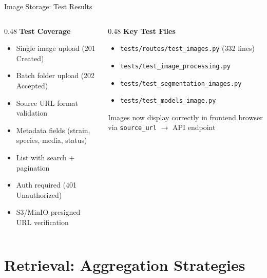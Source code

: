 \documentclass[aspectratio=169,11pt]{beamer}
\begin{document}
\begin{frame}{Image Storage: Test Results}
  \begin{columns}[T]
    \begin{column}{0.48\textwidth}
      \textbf{Test Coverage}
      \begin{itemize}
        \item Single image upload (201 Created)
        \item Batch folder upload (202 Accepted)
        \item Source URL format validation
        \item Metadata fields (strain, species, media, status)
        \item List with search + pagination
        \item Auth required (401 Unauthorized)
        \item S3/MinIO presigned URL verification
      \end{itemize}
    \end{column}
    \begin{column}{0.48\textwidth}
      \textbf{Key Test Files}
      \begin{itemize}
        \item \texttt{tests/routes/test\_images.py} (332 lines)
        \item \texttt{tests/test\_image\_processing.py}
        \item \texttt{tests/test\_segmentation\_images.py}
        \item \texttt{tests/test\_models\_image.py}
      \end{itemize}

      \vspace{1em}
      \begin{block}{}
        \centering
        \alert{Images now display correctly in frontend browser}
        via \texttt{source\_url} $\to$ API endpoint
      \end{block}
    \end{column}
  \end{columns}
\end{frame}

\section{Retrieval: Aggregation Strategies}
\end{document}

